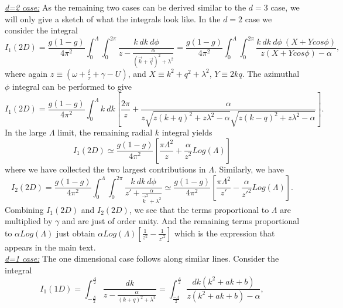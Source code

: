 \documentclass[prl,aps,twocolumn,groupaddress]{revtex4-1}
\begin{document}
\underline{\textit{d=2 case:}} As the remaining two cases can be derived similar to the $d=3$ case, we will only give a sketch of what the integrals look like. In the $d=2$ case we consider the integral
\begin{equation}
I_1(2D) = \frac{g(1-g)}{4 \pi^2}\int_0^{\Lambda} \int_0^{2\pi}\frac{k~dk~d\phi}{z - \frac{\alpha}{\left(\vec k + \vec q\right)^2 + \lambda^2}} =  \frac{g(1-g)}{4 \pi^2} \int_0^{\Lambda}\int_0^{2\pi} \frac{k~dk~d\phi ~(X + Y cos\phi)}{z(X+ Y cos\phi) - \alpha},
\end{equation}
where again $z\equiv \left( \omega + \frac{i}{\tau} + \gamma -U  \right)$, and $X\equiv k^2 + q^2 +\lambda^2$, $Y \equiv 2 k q$. The azimuthal $\phi$ integral can be performed to give
\begin{equation}
I_1(2D) = \frac{g(1-g)}{4\pi^2} \int_0^{\Lambda} k~dk\left[ \frac{2\pi}{z} + \frac{\alpha}{z \sqrt{z(k+q)^2 + z \lambda^2 -\alpha} \sqrt{z(k-q)^2 + z \lambda^2 - \alpha}}\right].
\end{equation}
In the large $\Lambda$ limit, the remaining radial $k$ integral yields 
\begin{equation}
I_1(2D)\simeq \frac{g(1-g)}{4 \pi^2} \left[\frac{\pi \Lambda^2}{z} + \frac{\alpha}{z^2}Log(\Lambda)\right]
\end{equation}
where we have collected the two largest contributions in $\Lambda$. Similarly, we have
\begin{equation}
I_2(2D)= \frac{g(1-g)}{4 \pi^2}\int_0^{\Lambda} \int_0^{2\pi}\frac{k~dk~d\phi}{z' +\frac{\alpha}{\vec k^2 + \lambda^2}}\simeq \frac{g(1-g)}{4 \pi^2} \left[\frac{\pi \Lambda^2}{z'} - \frac{\alpha}{z'^2}Log(\Lambda)\right].
\end{equation}
Combining $I_1(2D)$ and $I_2(2D)$, we see that the terms proportional to $\Lambda$ are multiplied by $\gamma$ and are just of order unity. And the remaining terms proportional to $\alpha Log(\Lambda)$  just obtain $\alpha Log(\Lambda) \left[\frac{1}{z^2} - \frac{1}{z'^2}\right]$ which is the expression that appears in the main text.\\ \newline
\underline{\textit{d=1 case:}} The one dimensional case follows along similar lines. Consider the integral
\begin{equation}
I_1(1D) = \int_{-\frac{\Lambda}{2}}^{\frac{\Lambda}{2}} \frac{dk}{z - \frac{\alpha}{(k+q)^2 + \lambda^2}} =  \int_{\frac{-\Lambda}{2}}^{\frac{\Lambda}{2}} \frac{d k \left(k^2 + a k +b \right)}{z\left(k^2 + a k + b \right) - \alpha},
\end{equation}
\end{document}
